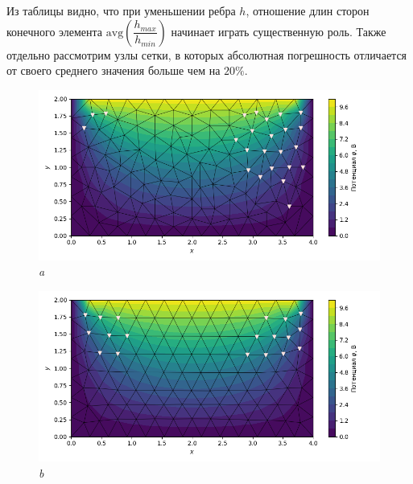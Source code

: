 \documentclass[12pt, a4paper]{article}
\begin{document}
			\vspace*{5mm}
			Из таблицы видно, что при уменьшении ребра $h$, отношение длин сторон конечного элемента $\mathrm{avg} \left( \dfrac{h_{max}}{h_{min}} \right)$ начинает играть существенную роль.			
			Также отдельно рассмотрим узлы сетки, в которых абсолютная погрешность отличается от своего среднего значения больше чем на $20\%$. 
			\vspace*{5mm}
			\begin{figure}[!h]  
				\centering     
				\vspace{5.0mm} 
				\begin{center} 
					{ 
						\begin{minipage}{0.45\textwidth} 
							\centering 
							\hspace*{-32.7mm}
							\includegraphics[width=1.4\columnwidth]{rect_dirichlet_only_005_err_nodes.png}\\ 
							\hspace*{-42.7mm}
							\textit{a} 
						\end{minipage}                                 
					} 
					{ 
						\begin{minipage}{0.45\textwidth} 
							\centering 
							\hspace*{-8.2mm}
							\includegraphics[width=1.4\columnwidth]{rect_dirichlet_only_005_calfem_err_nodes.png}\\ 
							\hspace*{2.2mm}
							\textit{b} 
						\end{minipage}                                 
					} 
									

\end{center}
\end{figure}
\end{document}
